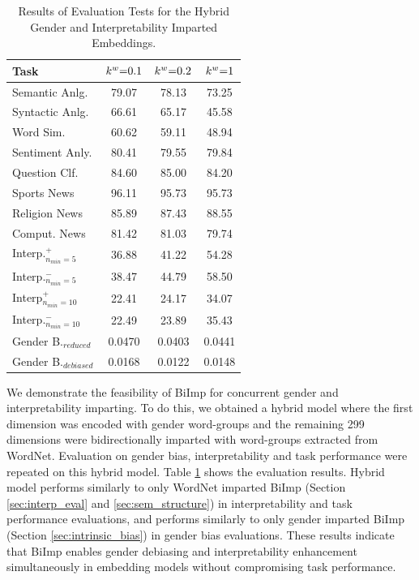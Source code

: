 \documentclass[11pt,a4paper]{article}
\def\proposedmethod{BiImp}
\begin{document}
\begin{table}
    \centering
	\begin{tabular}{lccc}
		\hline \hline 
		\textbf{Task} & \textbf{$\setlength{\thickmuskip}{0mu}k^w=0.1$} & \textbf{$\setlength{\thickmuskip}{0mu}k^w=0.2$} & \textbf{$\setlength{\thickmuskip}{0mu}k^w=1$}\\ \hline \hline %
	    Semantic Anlg. & 79.07 & 78.13 & 73.25 \\
	    Syntactic Anlg. & 66.61 & 65.17 & 45.58 \\ 
	    \hline %
	    Word Sim. & 60.62 & 59.11 & 48.94 \\
	    \hline %
	    Sentiment Anly. & 80.41 & 79.55 & 79.84 \\ \hline %
	    Question Clf. & 84.60 & 85.00 & 84.20 \\ \hline %
	    Sports News & 96.11 & 95.73 & 95.73 \\
	    Religion News & 85.89 & 87.43 & 88.55 \\
	    Comput. News & 81.42 & 81.03 & 79.74 \\\hline
	    Interp.$^+_{n_{min}=5}$ & 36.88 & 41.22 & 54.28 \\
	    Interp.$^-_{n_{min}=5}$ & 38.47 & 44.79 & 58.50 \\
	    Interp$^+_{n_{min}=10}$ & 22.41 & 24.17 & 34.07 \\
	    Interp.$^-_{n_{min}=10}$ & 22.49 & 23.89 & 35.43 \\\hline
	    Gender B.$_{reduced}$ & 0.0470 & 0.0403 & 0.0441 \\
	    Gender B.$_{debiased}$ & 0.0168 & 0.0122 & 0.0148 \\ 

	    \hline \hline %
	\end{tabular}
	\caption{ Results of Evaluation Tests for the Hybrid Gender and Interpretability Imparted Embeddings.}
	\label{tab:gender_plus_wordnet}	
\end{table}

We demonstrate the feasibility of \proposedmethod{} for concurrent gender and interpretability imparting. To do this, we obtained a hybrid model where the first dimension was encoded with gender word-groups and the remaining 299 dimensions were bidirectionally imparted with word-groups extracted from WordNet. Evaluation on gender bias, interpretability and task performance were repeated on this hybrid model. Table \ref{tab:gender_plus_wordnet} shows the evaluation results. Hybrid model performs similarly to only WordNet imparted \proposedmethod{} (Section \ref{sec:interp_eval} and \ref{sec:sem_structure}) in interpretability and task performance evaluations, and performs similarly to only gender imparted \proposedmethod{} (Section \ref{sec:intrinsic_bias}) in gender bias evaluations. These results indicate that \proposedmethod{} enables gender debiasing and interpretability enhancement simultaneously in embedding models without compromising task performance.
\end{document}
